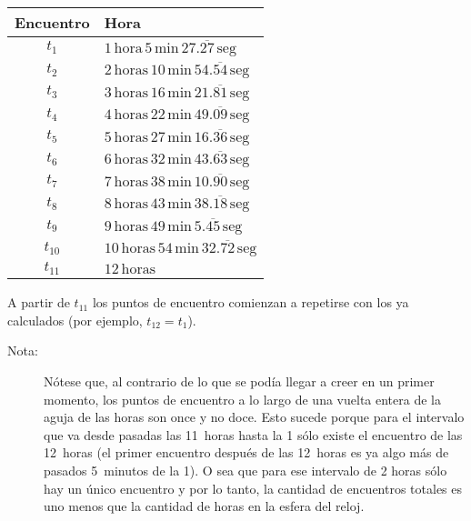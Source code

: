 \documentclass[a4paper,11pt]{article}
\begin{document}
\begin{description}
\begin{center}
\begin{tabular}{|c|l|}
\hline
Encuentro & Hora \\
\hline
$t_1$ & $1\,\text{hora}\,5\,\text{min}\,27.\overline{27}\,\text{seg}$ \\
$t_2$ & $2\,\text{horas}\,10\,\text{min}\,54.\overline{54}\,\text{seg}$ \\
$t_3$ & $3\,\text{horas}\,16\,\text{min}\,21.\overline{81}\,\text{seg}$ \\
$t_4$ & $4\,\text{horas}\,22\,\text{min}\,49.\overline{09}\,\text{seg}$ \\
$t_5$ & $5\,\text{horas}\,27\,\text{min}\,16.\overline{36}\,\text{seg}$ \\
$t_6$ & $6\,\text{horas}\,32\,\text{min}\,43.\overline{63}\,\text{seg}$ \\
$t_7$ & $7\,\text{horas}\,38\,\text{min}\,10.\overline{90}\,\text{seg}$ \\
$t_8$ & $8\,\text{horas}\,43\,\text{min}\,38.\overline{18}\,\text{seg}$ \\
$t_9$ & $9\,\text{horas}\,49\,\text{min}\,5.\overline{45}\,\text{seg}$ \\
$t_{10}$ & $10\,\text{horas}\,54\,\text{min}\,32.\overline{72}\,\text{seg}$ \\
$t_{11}$ & $12\,\text{horas}$ \\
\hline
\end{tabular}
\end{center}

A partir de $t_{11}$ los puntos de encuentro comienzan a repetirse con los ya
calculados (por ejemplo, $t_{12} = t_{1}$).

\begin{description}
\item[Nota:]
N\'otese que, al contrario de lo que se pod\'ia llegar a creer en un primer
    momento, los puntos de encuentro a lo largo de una vuelta entera de la
    aguja de las horas son once y no doce. Esto sucede porque para el
    intervalo que va desde pasadas las \mbox{11 horas} hasta la 1 s\'olo
    existe el encuentro de las \mbox{12 horas} (el primer encuentro despu\'es
    de las \mbox{12 horas} es ya algo m\'as de pasados \mbox{5 minutos} de la
    1). O sea que para ese intervalo de 2 horas s\'olo hay un \'unico
    encuentro y por lo tanto, la cantidad de encuentros totales es uno menos
    que la cantidad de horas en la esfera del reloj.
\end{description}

\end{description}
\end{document}
